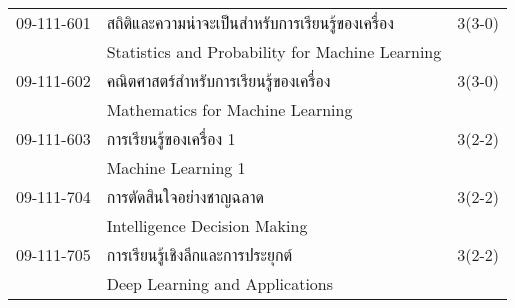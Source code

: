 \begin{longtable}{p{}p{}r{}}
09-111-601 & สถิติและความน่าจะเป็นสำหรับการเรียนรู้ของเครื่อง & 3(3-0)\\
& Statistics and Probability for Machine Learning & \\[3mm]
09-111-602 & คณิตศาสตร์สำหรับการเรียนรู้ของเครื่อง & 3(3-0)\\
& Mathematics for Machine Learning & \\[3mm]
09-111-603 & การเรียนรู้ของเครื่อง 1 & 3(2-2)\\
& Machine Learning 1 & \\[3mm]
09-111-704 & การตัดสินใจอย่างชาญฉลาด & 3(2-2)\\
& Intelligence Decision Making & \\[3mm]
09-111-705 & การเรียนรู้เชิงลึกและการประยุกต์ & 3(2-2)\\
& Deep Learning and Applications & \\[3mm]
\end{longtable}
